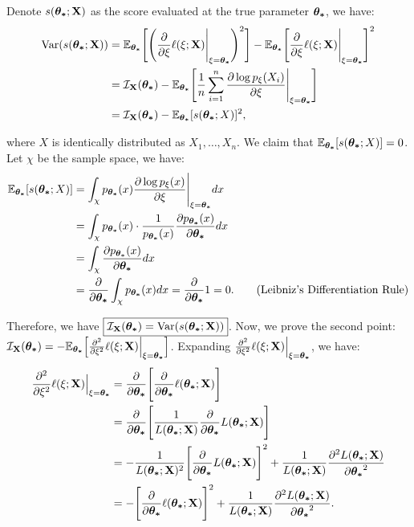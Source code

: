 \begin{proof*}
    Denote $s(\boldsymbol{\theta_*};{\bf X})$ as the score evaluated at the true parameter $\boldsymbol{\theta_*}$, we have:
    \begin{align*}
        \mathrm{Var}(s(\boldsymbol{\theta_*};{\bf X})) &= \mathbb{E}_{\boldsymbol{\theta_*}}\Bigg[ 
            \Bigg( 
                \frac{\partial}{\partial\xi}\ell(\xi;{\bf X})\Bigg|_{\xi=\boldsymbol{\theta_*}}
             \Bigg)^2
         \Bigg] - \mathbb{E}_{\boldsymbol{\theta_*}}\Bigg[ 
            \frac{\partial}{\partial\xi}\ell(\xi;{\bf X})\Bigg|_{\xi=\boldsymbol{\theta_*}}
         \Bigg]^2 \\
        &= \mathcal{I}_{{\bf X}}(\boldsymbol{\theta_*}) - \mathbb{E}_{\boldsymbol{\theta_*}}\Bigg[ 
            \frac{1}{n}\sum_{i=1}^n \frac{\partial\log p_\xi(X_i)}{\partial\xi}\Bigg|_{\xi=\boldsymbol{\theta_*}}
         \Bigg] \\
        &= \mathcal{I}_{{\bf X}}(\boldsymbol{\theta_*}) - \mathbb{E}_{\boldsymbol{\theta_*}}[s(\boldsymbol{\theta_*};X)]^2,
    \end{align*}

    \noindent where $X$ is identically distributed as $X_1, \dots, X_n$. We claim that $\mathbb{E}_{\boldsymbol{\theta_*}}[s(\boldsymbol{\theta_*};X)]=0$. Let $\chi$ be the sample space, we have:
    \begin{align*}
        \mathbb{E}_{\boldsymbol{\theta_*}}[s(\boldsymbol{\theta_*};X)] &= \int_\chi p_{\boldsymbol{\theta_*}}(x) \frac{\partial\log p_\xi(x)}{\partial\xi}\Bigg|_{\xi=\boldsymbol{\theta_*}}dx \\
            &= \int_\chi p_{\boldsymbol{\theta_*}}(x)\cdot \frac{1}{p_{\boldsymbol{\theta_*}}(x)}\frac{\partial p_{\boldsymbol{\theta_*}}(x)}{\partial\boldsymbol{\theta_*}}dx \\
            &= \int_\chi \frac{\partial p_{\boldsymbol{\theta_*}}(x)}{\partial\boldsymbol{\theta_*}}dx \\
            &= \frac{\partial}{\partial\boldsymbol{\theta_*}}\int_\chi p_{\boldsymbol{\theta_*}}(x)dx = \frac{\partial}{\partial\boldsymbol{\theta_*}}1 = 0. \qquad \text{(Leibniz's Differentiation Rule)}
    \end{align*} 

    \noindent Therefore, we have $\boxed{\mathcal{I}_{{\bf X}}(\boldsymbol{\theta_*}) = \mathrm{Var}(s(\boldsymbol{\theta_*};{\bf X}))}$. Now, we prove the second point: $\mathcal{I}_{{\bf X}}(\boldsymbol{\theta_*}) = -\mathbb{E}_{\boldsymbol{\theta_*}}\Big[ \frac{\partial^2}{\partial\xi^2}\ell(\xi;{\bf X})\Big|_{\xi=\boldsymbol{\theta_*}} \Big]$. Expanding $\frac{\partial^2}{\partial\xi^2}\ell(\xi;{\bf X})\Big|_{\xi=\boldsymbol{\theta_*}}$, we have:
    \begin{align*}
        \frac{\partial^2}{\partial\xi^2}\ell(\xi;{\bf X})\Big|_{\xi=\boldsymbol{\theta_*}} &= \frac{\partial}{\partial\boldsymbol{\theta_*}}\Bigg[ \frac{\partial}{\partial\boldsymbol{\theta_*}}\ell(\boldsymbol{\theta_*};{\bf X}) \Bigg] \\
        &= \frac{\partial}{\partial\boldsymbol{\theta_*}}\Bigg[ \frac{1}{L(\boldsymbol{\theta_*};{\bf X})}\frac{\partial}{\partial\boldsymbol{\theta_*}}L(\boldsymbol{\theta_*};{\bf X}) \Bigg] \\
        &= -\frac{1}{L(\boldsymbol{\theta_*};{\bf X})^2}\Bigg[ \frac{\partial}{\partial\boldsymbol{\theta_*}} L(\boldsymbol{\theta_*};{\bf X}) \Bigg]^2 + \frac{1}{L(\boldsymbol{\theta_*};{\bf X})}\frac{\partial^2 L(\boldsymbol{\theta_*};{\bf X})}{\partial\boldsymbol{\theta_*}^2} \\
        &= -\Bigg[ \frac{\partial}{\partial\boldsymbol{\theta_*}}\ell(\boldsymbol{\theta_*};{\bf X}) \Bigg]^2 + \frac{1}{L(\boldsymbol{\theta_*};{\bf X})}\frac{\partial^2 L(\boldsymbol{\theta_*};{\bf X})}{\partial\boldsymbol{\theta_*}^2}.
    \end{align*} 


\end{proof*}
